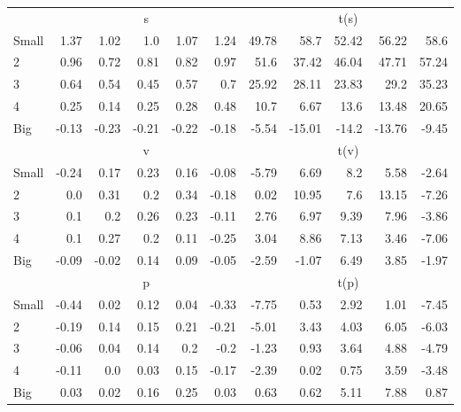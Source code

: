 \begin{table}[!ht]
\begin{tabular}{lrrrrrrrrrr}
      & \multicolumn{5}{c}{s} & \multicolumn{5}{c}{t(s)}
    
    \\
      \cmidrule(r){2-6} \cmidrule(r){7-11}

    Small   & 1.37  & 1.02  & 1.0  & 1.07  & 1.24  & 49.78  & 58.7  & 52.42  & 56.22  & 58.6  \\
         2  & 0.96  & 0.72  & 0.81  & 0.82  & 0.97  & 51.6  & 37.42  & 46.04  & 47.71  & 57.24  \\
         3  & 0.64  & 0.54  & 0.45  & 0.57  & 0.7  & 25.92  & 28.11  & 23.83  & 29.2  & 35.23  \\
         4  & 0.25  & 0.14  & 0.25  & 0.28  & 0.48  & 10.7  & 6.67  & 13.6  & 13.48  & 20.65  \\
    Big     & -0.13  & -0.23  & -0.21  & -0.22  & -0.18  & -5.54  & -15.01  & -14.2  & -13.76  & -9.45  \\

  
    
      & \multicolumn{5}{c}{v} & \multicolumn{5}{c}{t(v)}
    
    \\
      \cmidrule(r){2-6} \cmidrule(r){7-11}

    Small   & -0.24  & 0.17  & 0.23  & 0.16  & -0.08  & -5.79  & 6.69  & 8.2  & 5.58  & -2.64  \\
         2  & 0.0  & 0.31  & 0.2  & 0.34  & -0.18  & 0.02  & 10.95  & 7.6  & 13.15  & -7.26  \\
         3  & 0.1  & 0.2  & 0.26  & 0.23  & -0.11  & 2.76  & 6.97  & 9.39  & 7.96  & -3.86  \\
         4  & 0.1  & 0.27  & 0.2  & 0.11  & -0.25  & 3.04  & 8.86  & 7.13  & 3.46  & -7.06  \\
    Big     & -0.09  & -0.02  & 0.14  & 0.09  & -0.05  & -2.59  & -1.07  & 6.49  & 3.85  & -1.97  \\

  
    
      & \multicolumn{5}{c}{p} & \multicolumn{5}{c}{t(p)}
    
    \\
      \cmidrule(r){2-6} \cmidrule(r){7-11}

    Small   & -0.44  & 0.02  & 0.12  & 0.04  & -0.33  & -7.75  & 0.53  & 2.92  & 1.01  & -7.45  \\
         2  & -0.19  & 0.14  & 0.15  & 0.21  & -0.21  & -5.01  & 3.43  & 4.03  & 6.05  & -6.03  \\
         3  & -0.06  & 0.04  & 0.14  & 0.2  & -0.2  & -1.23  & 0.93  & 3.64  & 4.88  & -4.79  \\
         4  & -0.11  & 0.0  & 0.03  & 0.15  & -0.17  & -2.39  & 0.02  & 0.75  & 3.59  & -3.48  \\
    Big     & 0.03  & 0.02  & 0.16  & 0.25  & 0.03  & 0.63  & 0.62  & 5.11  & 7.88  & 0.87  \\


\end{tabular}
\end{table}
